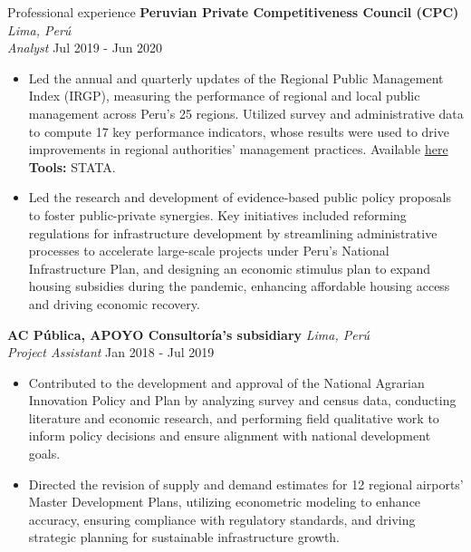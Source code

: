 \documentclass{resume} %
\begin{document}
\begin{rSection}{Professional experience}
 \textbf{Peruvian Private Competitiveness Council (CPC)} \hfill \textit{Lima, Perú}\\
\textit{Analyst} \hfill Jul 2019 - Jun 2020
 \begin{itemize}
    \itemsep -3pt {} 
      \item Led the annual and quarterly updates of the Regional Public Management Index (IRGP), measuring the performance of regional and local public management across Peru’s 25 regions. Utilized survey and administrative data to compute 17 key performance indicators, whose results were used to drive improvements in regional authorities’ management practices. Available \href{https://www.compite.pe/wp-content/uploads/2020/07/IRGP-2020-version-final.pdf}{here} \\ \textbf{Tools:} STATA. 
      \item Led the research and development of evidence-based public policy proposals to foster public-private synergies. Key initiatives included reforming regulations for infrastructure development by streamlining administrative processes to accelerate large-scale projects under Peru's National Infrastructure Plan, and designing an economic stimulus plan to expand housing subsidies during the pandemic, enhancing affordable housing access and driving economic recovery. 
 \end{itemize}

\textbf{AC Pública, APOYO Consultoría's subsidiary} \hfill \textit{Lima, Perú}\\
\textit{Project Assistant} \hfill Jan 2018 - Jul 2019
 \begin{itemize}
    \itemsep -3pt {} 
     \item Contributed to the development and approval of the National Agrarian Innovation Policy and Plan by analyzing survey and census data, conducting literature and economic research, and performing field qualitative work to inform policy decisions and ensure alignment with national development goals.
     \item Directed the revision of supply and demand estimates for 12 regional airports’ Master Development Plans, utilizing econometric modeling to enhance accuracy, ensuring compliance with regulatory standards, and driving strategic planning for sustainable infrastructure growth.
 \end{itemize}
\end{rSection} 
\pagebreak
\end{document}
